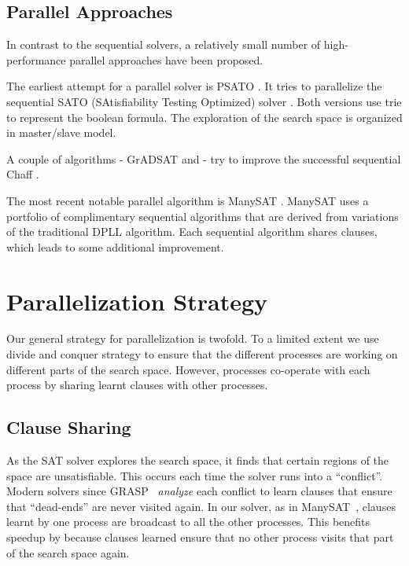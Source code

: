 \documentclass[letterpaper, compsoc, conference]{IEEEtran}
\begin{document}
\subsection{Parallel Approaches}
In contrast to the sequential solvers, a relatively small number of 
high-performance parallel approaches have been proposed.

\indent The earliest attempt for a parallel solver is PSATO \cite{PSATO}. It tries
to parallelize the sequential SATO (SAtisfiability Testing Optimized) solver
\cite{SATO}. Both versions use trie to represent the boolean formula. The exploration
of the search space is organized in master/slave model.

\indent A couple of algorithms - GrADSAT \cite{GRADSAT} and \cite{Blochinger} -
try to improve the successful sequential Chaff \cite{CHAFF}.

\indent The most recent notable parallel algorithm is ManySAT \citep{ManySAT}.
ManySAT uses a portfolio of complimentary sequential algorithms that are derived
from variations of the traditional DPLL algorithm. Each sequential algorithm shares
clauses, which leads to some additional improvement.

\section{Parallelization Strategy}
\label{sec:strategy}

Our general strategy for parallelization is twofold. To a limited extent we use
divide and conquer strategy to ensure that the different processes are working
on different parts of the search space. However, processes co-operate with each
process by sharing learnt clauses with other processes. 

\subsection{Clause Sharing}

As the SAT solver explores the search space, it finds that certain regions of
the space are unsatisfiable. This occurs each time the solver runs into a
``conflict''. Modern solvers since GRASP~\cite{GRASP} \emph{analyze} each
conflict to learn clauses that ensure that ``dead-ends'' are never visited
again. In our solver, as in ManySAT~\cite{ManySAT}, clauses learnt by one
process are broadcast to all the other processes. This benefits speedup by
because clauses learned ensure that no other process visits that part 
of the search space again.
\end{document}
